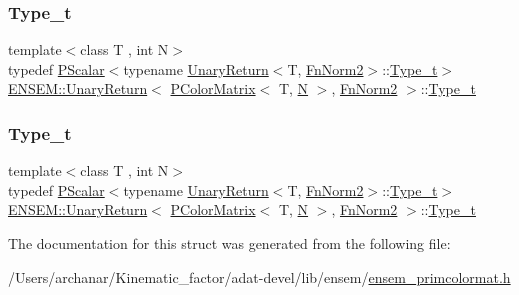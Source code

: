 \subsubsection{\texorpdfstring{Type\_t}{Type\_t}\hspace{0.1cm}{\footnotesize\ttfamily [2/3]}}
{\footnotesize\ttfamily template$<$class T , int N$>$ \\
typedef \mbox{\hyperlink{classENSEM_1_1PScalar}{P\+Scalar}}$<$typename \mbox{\hyperlink{structENSEM_1_1UnaryReturn}{Unary\+Return}}$<$T, \mbox{\hyperlink{structENSEM_1_1FnNorm2}{Fn\+Norm2}}$>$\+::\mbox{\hyperlink{structENSEM_1_1UnaryReturn_3_01PColorMatrix_3_01T_00_01N_01_4_00_01FnNorm2_01_4_ae6f0888acac23f20273fc635923e42cc}{Type\+\_\+t}}$>$ \mbox{\hyperlink{structENSEM_1_1UnaryReturn}{E\+N\+S\+E\+M\+::\+Unary\+Return}}$<$ \mbox{\hyperlink{classENSEM_1_1PColorMatrix}{P\+Color\+Matrix}}$<$ T, \mbox{\hyperlink{adat__devel_2lib_2hadron_2operator__name__util_8cc_a7722c8ecbb62d99aee7ce68b1752f337}{N}} $>$, \mbox{\hyperlink{structENSEM_1_1FnNorm2}{Fn\+Norm2}} $>$\+::\mbox{\hyperlink{structENSEM_1_1UnaryReturn_3_01PColorMatrix_3_01T_00_01N_01_4_00_01FnNorm2_01_4_ae6f0888acac23f20273fc635923e42cc}{Type\+\_\+t}}}

\mbox{\label{structENSEM_1_1UnaryReturn_3_01PColorMatrix_3_01T_00_01N_01_4_00_01FnNorm2_01_4_ae6f0888acac23f20273fc635923e42cc}} 
\subsubsection{\texorpdfstring{Type\_t}{Type\_t}\hspace{0.1cm}{\footnotesize\ttfamily [3/3]}}
{\footnotesize\ttfamily template$<$class T , int N$>$ \\
typedef \mbox{\hyperlink{classENSEM_1_1PScalar}{P\+Scalar}}$<$typename \mbox{\hyperlink{structENSEM_1_1UnaryReturn}{Unary\+Return}}$<$T, \mbox{\hyperlink{structENSEM_1_1FnNorm2}{Fn\+Norm2}}$>$\+::\mbox{\hyperlink{structENSEM_1_1UnaryReturn_3_01PColorMatrix_3_01T_00_01N_01_4_00_01FnNorm2_01_4_ae6f0888acac23f20273fc635923e42cc}{Type\+\_\+t}}$>$ \mbox{\hyperlink{structENSEM_1_1UnaryReturn}{E\+N\+S\+E\+M\+::\+Unary\+Return}}$<$ \mbox{\hyperlink{classENSEM_1_1PColorMatrix}{P\+Color\+Matrix}}$<$ T, \mbox{\hyperlink{adat__devel_2lib_2hadron_2operator__name__util_8cc_a7722c8ecbb62d99aee7ce68b1752f337}{N}} $>$, \mbox{\hyperlink{structENSEM_1_1FnNorm2}{Fn\+Norm2}} $>$\+::\mbox{\hyperlink{structENSEM_1_1UnaryReturn_3_01PColorMatrix_3_01T_00_01N_01_4_00_01FnNorm2_01_4_ae6f0888acac23f20273fc635923e42cc}{Type\+\_\+t}}}



The documentation for this struct was generated from the following file\+:\begin{DoxyCompactItemize}
\item 
/\+Users/archanar/\+Kinematic\+\_\+factor/adat-\/devel/lib/ensem/\mbox{\hyperlink{adat-devel_2lib_2ensem_2ensem__primcolormat_8h}{ensem\+\_\+primcolormat.\+h}}\end{DoxyCompactItemize}
